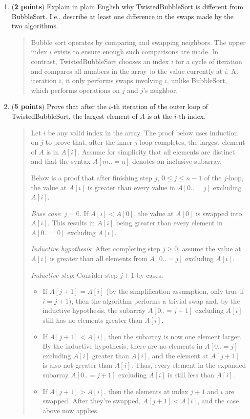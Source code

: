 \documentclass[11pt]{article}
\begin{document}
\begin{enumerate}[leftmargin=*]
\begin{enumerate}
    \item (\textbf{2 points}) Explain in plain English why TwistedBubbleSort is different from BubbleSort. I.e., describe at least one difference in the swaps made by the two algorithms.
      \begin{quote}
        \color{purple}
        Bubble sort operates by comparing and swapping neighbors. The upper index $i$ exists to ensure enough such comparisons are made. In contrast, TwistedBubbleSort chooses an index $i$ for a cycle of iteration and compares all numbers in the array to the value currently at $i$. At iteration $i$, it only performs swaps involving $i$, unlike BubbleSort, which performs operations on $j$ and $j$'s neighbor.
      \end{quote}
    \item (\textbf{5 points}) Prove that after the $i$-th iteration of the outer loop of TwistedBubbleSort, the largest element of $A$ is at the $i$-th index.
      \begin{quote}
        \color{purple}
        Let $i$ be any valid index in the array. The proof below uses induction on $j$ to prove that, after the inner $j$-loop completes, the largest element of $A$ is in $A[i]$. Assume for simplicity that all elements are distinct and that the syntax $A[m..=n]$ denotes an inclusive subarray. 

        \medskip
        Below is a proof that after finishing step $j$, $0 \leq j \leq n - 1$ of the $j$-loop, the value at $A[i]$ is greater than every value in $A[0..=j]$ excluding $A[i]$.

        \medskip
        \textit{Base case}: $j = 0$. If $A[i] < A[0]$, the value at $A[0]$ is swapped into $A[i]$. This results in $A[i]$ being greater than every element in $A[0..=0]$ excluding $A[i]$. 

        \medskip
        \textit{Inductive hypothesis}: After completing step $j \geq 0$, assume the value at $A[i]$ is greater than all elements from $A[0..=j]$ excluding $A[i]$. 

        \medskip 
        \textit{Inductive step}: Consider step $j + 1$ by cases. 
        \begin{itemize}
          \item If $A[j + 1] = A[i]$ (by the simplification assumption, only true if $i = j + 1$), then the algorithm performs a trivial swap and, by the inductive hypothesis, the subarray $A[0..=j+1]$ excluding $A[i]$ still has no elements greater than $A[i]$. 
          \item If $A[j + 1] < A[i]$, then the subarray is now one element larger. By the inductive hypothesis, there are no elements in $A[0..=j]$ excluding $A[i]$ greater than $A[i]$, and the element at $A[j + 1]$ is also not greater than $A[i]$. Thus, every element in the expanded subarray $A[0..=j + 1]$ excluding $A[i]$ is still less than $A[i]$. 
          \item If $A[j + 1] > A[i]$, then the elements at index $j + 1$ and $i$ are swapped. After they're swapped, $A[j + 1] < A[i]$, and the case above now applies. 
        \end{itemize}


\end{quote}
\end{enumerate}
\end{enumerate}
\end{document}

